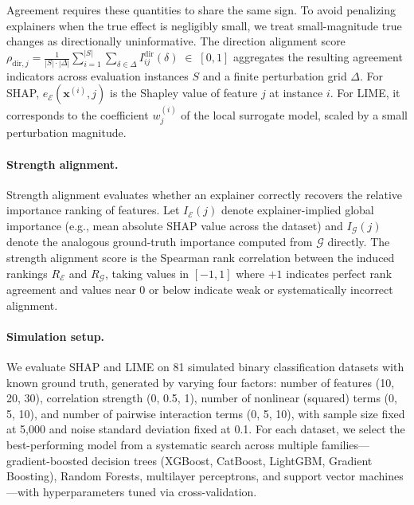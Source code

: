 \documentclass[11pt]{article}
\begin{document}
Agreement requires these quantities to share the same sign. To avoid penalizing explainers when the true effect is negligibly small, we treat small-magnitude true changes as directionally uninformative. The direction alignment score $\rho_{\mathrm{dir},j} = \frac{1}{|S|\cdot|\Delta|} \sum_{i=1}^{|S|} \sum_{\delta \in \Delta} I^{\mathrm{dir}}_{ij}(\delta) \;\in\; [0,1]$ 
aggregates the resulting agreement indicators across evaluation instances $S$ and a finite perturbation grid $\Delta$. For SHAP, $e_{\mathcal{E}}(\mathbf{x}^{(i)}, j)$ is the Shapley value of feature $j$ at instance $i$. For LIME, it corresponds to the coefficient $w^{(i)}_j$ of the local surrogate model, scaled by a small perturbation magnitude.

\paragraph{Strength alignment.}
Strength alignment evaluates whether an explainer correctly recovers the relative importance ranking of features. Let $I_{\mathcal{E}}(j)$ denote explainer-implied global importance (e.g., mean absolute SHAP value across the dataset) and $I_{\mathcal{G}}(j)$ denote the analogous ground-truth importance computed from $\mathcal{G}$ directly. The strength alignment score is the Spearman rank correlation between the induced rankings $R_{\mathcal{E}}$ and $R_{\mathcal{G}}$, 
taking values in $[-1,1]$ where $+1$ indicates perfect rank agreement and values near $0$ or below indicate weak or systematically incorrect alignment.

\paragraph{Simulation setup.}
We evaluate SHAP and LIME on 81 simulated binary classification datasets with known ground truth, generated by varying four factors: number of features (10, 20, 30), correlation strength (0, 0.5, 1), number of nonlinear (squared) terms (0, 5, 10), and number of pairwise interaction terms (0, 5, 10), with sample size fixed at 5{,}000 and noise standard deviation fixed at 0.1. For each dataset, we select the best-performing model from a systematic search across multiple families---gradient-boosted decision trees (XGBoost, CatBoost, LightGBM, Gradient Boosting), Random Forests, multilayer perceptrons, and support vector machines---with hyperparameters tuned via cross-validation.
\end{document}
